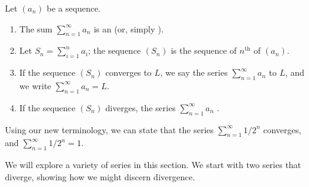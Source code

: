 \documentclass{ximera}
\begin{document}
\begin{definition}
Let $(a_n)$ be a sequence.
\begin{enumerate}
\item The sum $\sum_{n=1}^\infty a_n$ is an  (or,
  simply ).
\item Let $S_n = \sum_{i=1}^n a_i$; the sequence $(S_n)$ is the
  sequence of $n^\text{th}$  of $(a_n)$.
\item If the sequence $(S_n)$ converges to $L$, we say the series
  $\sum_{n=1}^\infty a_n$  to $L$, and we write
  $\sum_{n=1}^\infty a_n = L$.
\item If the sequence $(S_n)$ diverges, the series $\sum_{n=1}^\infty
  a_n$ .
\end{enumerate}
\end{definition}

Using our new terminology, we can state that the series
$\sum_{n=1}^\infty 1/2^n$ converges, and $\sum_{n=1}^\infty 1/2^n =
1.$

We will explore a variety of series in this section. We start with two
series that diverge, showing how we might discern divergence.
\end{document}
